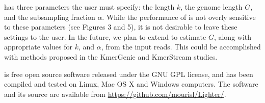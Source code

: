 \documentclass{bmcart}
\begin{document}
\tool has three parameters the user must specify: the \kmer length $k$, the genome length $G$, and the subsampling fraction $\alpha$.
While the performance of \tool is not overly sensitive to these parameters (see Figures 3 and 5), it is not desirable to leave these settings to the user.
In the future, we plan to extend \tool to estimate $G$, along with appropriate values for $k$, and $\alpha$, from the input reads.
This could be accomplished with methods proposed in the KmerGenie \cite{chikhi2014informed} and KmerStream \cite{melsted2014kmerstream} studies.

\tool is free open source software released under the GNU GPL license, and has been compiled and tested on Linux, Mac OS X and Windows computers.  The software and its source are available from \url{https://github.com/mourisl/Lighter/}.

\end{document}
